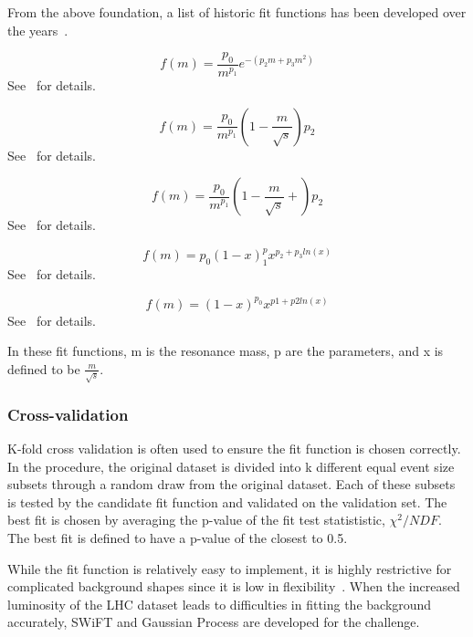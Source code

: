 From the above foundation, a list of historic fit functions has been developed over the years~\cite{Pachal:2063032}.

    \begin{equation}
        f(m)=\frac{p_{0}}{m^{p_{1}}}e^{-(p_{2}m+p_{3}m^{2})}
    \end{equation}See~\cite{UA2:1990gao} for details.

    \begin{equation}
        f(m)=\frac{p_{0}}{m^{p_{1}}}(1-\frac{m}{\sqrt{s}})p_{2}
    \end{equation}See~\cite{1995} for details.

    \begin{equation}
        f(m)=\frac{p_{0}}{m^{p_{1}}}(1-\frac{m}{\sqrt{s}}+)p_{2}
    \end{equation}See~\cite{b582dc2d9c234174bfe2adbc9729bf42} for details.

    \begin{equation}
        f(m)=p_{0}(1-x)^p_{1}x^{p_{2}+p_{3}ln(x)}
    \end{equation}See~\cite{2009} for details.

    \begin{equation}
        f(m)=(1-x)^{p_{0}}x^{p1+p2ln(x)}
    \end{equation}See~\cite{2014} for details.

    In these fit functions, m is the resonance mass, p are the parameters, and x is defined to be $\frac{m}{\sqrt{s}}$.

\subsubsection{Cross-validation}
K-fold cross validation is often used to ensure the fit function is chosen correctly. In the procedure, the original dataset is divided into k different equal event size subsets through a random draw from the original dataset. Each of these subsets is tested by the candidate fit function and validated on the validation set. The best fit is chosen by averaging the p-value of the fit test statististic, $\chi^{2}/NDF$. The best fit is defined to have a p-value of the closest to 0.5.

While the fit function is relatively easy to implement, it is highly restrictive for complicated background shapes since it is low in flexibility~\cite{ATL-PHYS-PUB-2020-028}. When the increased luminosity of the LHC dataset leads to difficulties in fitting the background accurately, SWiFT and Gaussian Process are developed for the challenge. 

